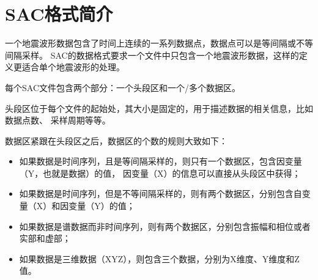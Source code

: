\section{SAC格式简介}
一个地震波形数据包含了时间上连续的一系列数据点，数据点可以是等间隔或不等间隔采样。
SAC的数据格式要求一个文件中只包含一个地震波形数据，这样的定义更适合单个地震波形的处理。

每个SAC文件包含两个部分：一个头段区和一个/多个数据区。

头段区位于每个文件的起始处，其大小是固定的，用于描述数据的相关信息，比如数据点数、
采样周期等等。

数据区紧跟在头段区之后，数据区的个数的规则大致如下：
\begin{itemize}
\item 如果数据是时间序列，且是等间隔采样的，则只有一个数据区，包含因变量（Y，也就是数据）的值，
    因变量（X）的信息可以直接从头段区中获得；
\item 如果数据是时间序列，但是不等间隔采样的，则有两个数据区，分别包含自变量（X）和因变量（Y）的值；
\item 如果数据是谱数据而非时间序列，则有两个数据区，分别包含振幅和相位或者实部和虚部；
\item 如果数据是三维数据（XYZ），则包含三个数据，分别为X维度、Y维度和Z值。
\end{itemize}
